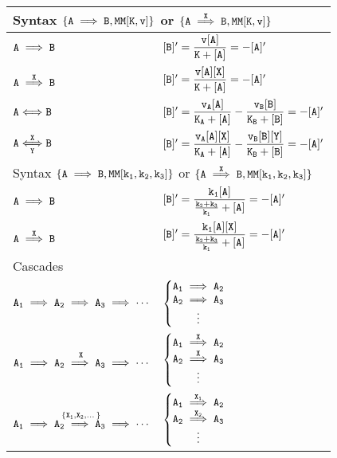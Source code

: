\documentclass[12pt,letterpaper]{article}
\begin{document}
\begin{center}
\begin{tabular}{|p{2in}|p{3in}|}
\hline
\multicolumn{2}{|l|}{
Syntax ${\tt \{A\implies B, MM[K,v]\}}$ or 
${\tt \{A\overset{X}\implies B, MM[K,v]\}}$
}
\\
\hline ${\tt A\implies B}$ & ${\tt [B]'=\dfrac{v[A]}{K+[A]}=-[A]' }$ \\ \hline
 ${\tt A\overset{X}\implies B}$ & ${\tt [B]'=\dfrac{v[A][X]}{K+[A]}=-[A]' }$ \\ \hline
  ${\tt A\Longleftrightarrow B}$ & ${\tt [B]'=\dfrac{v_A[A]}{K_A+[A]}-\dfrac{v_B[B]}{K_B+[B]}=-[A]' }$ \\ \hline
  ${\tt A\underset{Y}{\overset{X}{\Longleftrightarrow}} B}$ & ${\tt [B]'=\dfrac{v_A[A][X]}{K_A+[A]}-\dfrac{v_B[B][Y]}{K_B+[B]}=-[A]' }$ \\ \hline
\multicolumn{2}{|l|}{
Syntax ${\tt \{A\implies B, MM[k_1,k_2,k_3]\}}$ or 
${\tt \{A\overset{X}\implies B, MM[k_1,k_2,k_3]\}}$
}
\\
\hline ${\tt A\implies B}$ & ${\tt [B]'=\dfrac{k_1[A]}{\frac{k_2+k_3}{k_1}+[A]}=-[A]' }$ \\ \hline
 ${\tt A\overset{X}\implies B}$ & ${\tt [B]'=\dfrac{k_1 [A][X]}{\frac{k_2+k_3}{k_1}+[A]}=-[A]' }$  \\ \hline
\multicolumn{2}{|l|}{Cascades}\\\hline
${\tt A_1 \implies A_2 \implies A_3 \implies \cdots}$ & 
$\left\{\begin{matrix}
{\tt A_1 \implies A_2}\\
{\tt A_2 \implies A_3}\\ \vdots
\end{matrix}\right.$ \\ \hline
$\overset{\tt X}{{\tt A_1 \implies A_2 \implies A_3 \implies \cdots}}$ & 
$\left\{\begin{matrix}
{\tt A_1 \overset{X}\implies A_2}\\
{\tt A_2 \overset{X}\implies A_3}\\ \vdots
\end{matrix}\right.$ \\ \hline
$\overset{\tt \{X_1,X_2,\dots\}}{{\tt A_1 \implies A_2 \implies A_3 \implies \cdots}}$ & 
$\left\{\begin{matrix}
{\tt A_1 \overset{X_1}\implies A_2}\\
{\tt A_2 \overset{X_2}\implies A_3}\\ \vdots
\end{matrix}\right.$ \\ \hline
\end{tabular}
\end{center}
\end{document}
